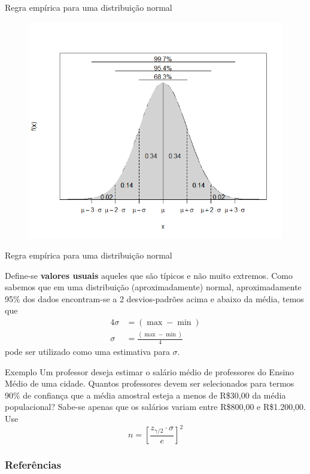 \documentclass[14pt,aspectratio=1610]{beamer}
\begin{document}
\begin{frame}{Regra empírica para uma distribuição normal}
\begin{block}{}
\justifying
\begin{figure}
    \centering
    \includegraphics[scale=0.6]{figs/ICEmpirico.png}
\end{figure}
  
\end{block}
\end{frame}

\begin{frame}{Regra empírica para uma distribuição normal}
    \begin{block}{}
    \justifying
Define-se \textbf{valores usuais} aqueles que são típicos e não muito extremos. Como sabemos que em uma distribuição (aproximadamente) normal, aproximadamente 95\% dos dados encontram-se a 2 desvios-padrões acima e
abaixo da média, temos que
\begin{align*}
4\sigma &= (\max - \min) \\
\sigma &= \frac{(\max - \min)}{4}
\end{align*}
pode ser utilizado como uma estimativa para $\sigma$.  
\end{block}
\end{frame}

\begin{frame}{}
\begin{block}{Exemplo}
\justifying
Um professor deseja estimar o salário médio de professores do Ensino Médio de uma cidade. Quantos professores devem ser selecionados para termos 90\% de confiança que a média amostral esteja a menos de R\$30,00 da média populacional? Sabe-se apenas que os
salários variam entre R\$800,00 e R\$1.200,00. Use
$$
n = \left[ \frac{z_{\gamma/2} \cdot \sigma}{e} \right]^2
$$  
\nocite{Apostila}
\end{block}
\nocite{Morettin09, Apostila, eric, montgomery2016, meyer1982probabilidade, Bastos2025}
\end{frame}

\begin{frame}[allowframebreaks]
\frametitle{\bf Referências}
\printbibliography
\end{frame}
\end{document}
